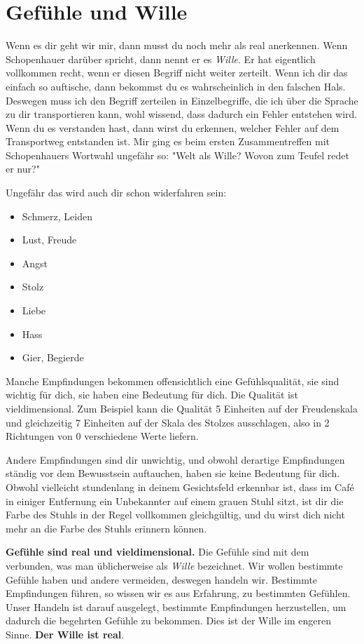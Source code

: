 \documentclass[12pt]{book}
\begin{document}
\section{Gefühle und Wille}

Wenn es dir geht wir mir, dann musst du noch mehr als real anerkennen. Wenn Schopenhauer darüber spricht, dann nennt er es \emph{Wille}. Er hat eigentlich vollkommen recht, wenn er diesen Begriff nicht weiter zerteilt. Wenn ich dir das einfach so auftische, dann bekommst du es wahrscheinlich in den falschen Hals. Deswegen muss ich den Begriff zerteilen in Einzelbegriffe, die ich über die Sprache zu dir transportieren kann, wohl wissend, dass dadurch ein Fehler entstehen wird. Wenn du es verstanden hast, dann wirst du erkennen, welcher Fehler auf dem Transportweg entstanden ist. Mir ging es beim ersten Zusammentreffen mit Schopenhauers Wortwahl ungefähr so: "Welt als Wille? Wovon zum Teufel redet er nur?"

Ungefähr das wird auch dir schon widerfahren sein:
\begin{itemize}
\item Schmerz, Leiden
\item Lust, Freude
\item Angst
\item Stolz
\item Liebe
\item Hass
\item Gier, Begierde
\end{itemize}

Manche Empfindungen bekommen offensichtlich eine Gefühlsqualität, sie sind wichtig für dich, sie haben eine Bedeutung für dich. Die Qualität ist vieldimensional. Zum Beispiel kann die Qualität 5 Einheiten auf der Freudenskala und gleichzeitig 7 Einheiten auf der Skala des Stolzes ausschlagen, also in 2 Richtungen von 0 verschiedene Werte liefern. 

Andere Empfindungen sind dir unwichtig, und obwohl derartige Empfindungen ständig vor dem Bewusstsein auftauchen, haben sie keine Bedeutung für dich. Obwohl vielleicht stundenlang in deinem Gesichtsfeld erkennbar ist, dass im Café in einiger Entfernung ein Unbekannter auf einem grauen Stuhl sitzt, ist dir die Farbe des Stuhls in der Regel vollkommen gleichgültig, und du 
wirst dich nicht mehr an die Farbe des Stuhls erinnern können.

\textbf{Gefühle sind real und vieldimensional.} Die Gefühle sind mit dem verbunden, was man üblicherweise als \emph{Wille} bezeichnet. Wir wollen bestimmte Gefühle haben und andere vermeiden, deswegen handeln wir. Bestimmte Empfindungen führen, so wissen wir es aus Erfahrung, zu bestimmten Gefühlen. Unser Handeln ist darauf ausgelegt, bestimmte Empfindungen herzustellen, um dadurch die begehrten Gefühle zu bekommen. Dies ist der Wille im engeren Sinne. \textbf{Der Wille ist real}.
\end{document}
